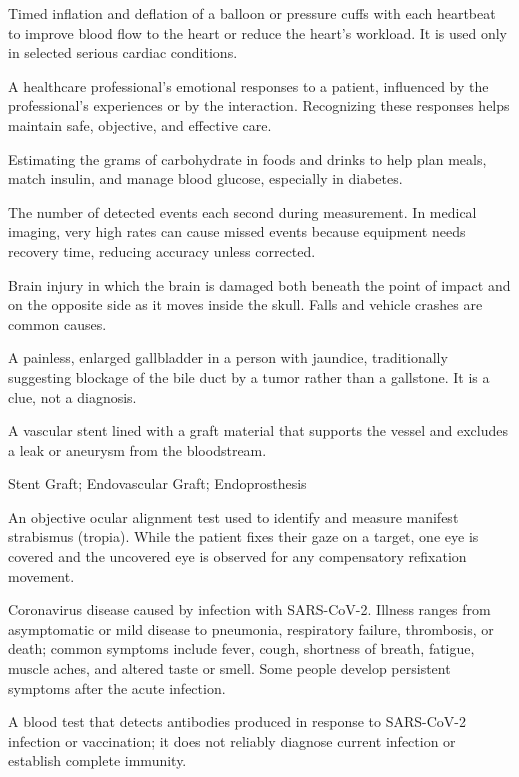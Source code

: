  Timed inflation and deflation of a balloon or pressure cuffs with each heartbeat to improve blood flow to the heart or reduce the heart's workload. It is used only in selected serious cardiac conditions.

 A healthcare professional's emotional responses to a patient, influenced by the professional's experiences or by the interaction. Recognizing these responses helps maintain safe, objective, and effective care.

 Estimating the grams of carbohydrate in foods and drinks to help plan meals, match insulin, and manage blood glucose, especially in diabetes.

 The number of detected events each second during measurement. In medical imaging, very high rates can cause missed events because equipment needs recovery time, reducing accuracy unless corrected.

 Brain injury in which the brain is damaged both beneath the point of impact and on the opposite side as it moves inside the skull. Falls and vehicle crashes are common causes.

 A painless, enlarged gallbladder in a person with jaundice, traditionally suggesting blockage of the bile duct by a tumor rather than a gallstone. It is a clue, not a diagnosis.

 A vascular stent lined with a graft material that supports the vessel and excludes a leak or
aneurysm from the bloodstream.

\synonyms
Stent Graft; Endovascular Graft; Endoprosthesis

 An objective ocular alignment test used to identify and measure manifest strabismus (tropia). While the patient fixes their gaze on a target, one eye is covered and the uncovered eye is observed for any compensatory refixation movement.

 Coronavirus disease caused by infection with SARS-CoV-2. Illness ranges from asymptomatic or mild disease to pneumonia, respiratory failure, thrombosis, or death; common symptoms include fever, cough, shortness of breath, fatigue, muscle aches, and altered taste or smell. Some people develop persistent symptoms after the acute infection.

 A blood test that detects antibodies produced in response to SARS-CoV-2 infection or vaccination; it does not reliably diagnose current infection or establish complete immunity.

